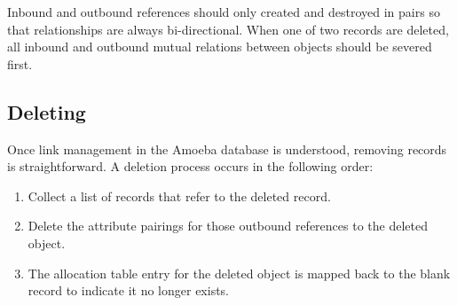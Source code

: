 \documentclass[11pt]{article}
\begin{document}
\newline
Inbound and outbound references should only created and destroyed in pairs so that relationships are always bi-directional. When one of two records are deleted, all inbound and outbound mutual relations between objects should be severed first.
\subsection{Deleting}
Once link management in the Amoeba database is understood, removing records is straightforward. A deletion process occurs in the following order:
\begin{enumerate}
\item Collect a list of records that refer to the deleted record.
\item Delete the attribute pairings for those outbound references to the deleted object.
\item The allocation table entry for the deleted object is mapped back to the blank record to indicate it no longer exists.
\end{enumerate}
\newpage
\noindent
\end{document}
